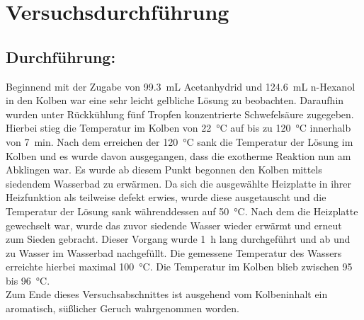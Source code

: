 \section{Versuchsdurchführung}
\label{sec:durchfuerung}


\subsection*{Durchführung:}
Beginnend mit der Zugabe von \SI{99,3}{\milli \liter} Acetanhydrid und \SI{124,6}{\milli \liter} n-Hexanol in den Kolben war eine sehr leicht gelbliche Lösung zu beobachten. Daraufhin wurden unter Rückkühlung fünf Tropfen konzentrierte Schwefelsäure zugegeben. Hierbei stieg die Temperatur im Kolben von \SI{22}{\celsius} auf bis zu \SI{120}{\celsius} innerhalb von \SI{7}{\minute}. Nach dem erreichen der \SI{120}{\celsius} sank die Temperatur der Lösung im Kolben und es wurde davon ausgegangen, dass die exotherme Reaktion nun am Abklingen war. Es wurde ab diesem Punkt begonnen den Kolben mittels siedendem Wasserbad zu erwärmen. Da sich die ausgewählte Heizplatte in ihrer Heizfunktion als teilweise defekt erwies, wurde diese ausgetauscht und die Temperatur der Lösung sank währenddessen auf \SI{50}{\celsius}. Nach dem die Heizplatte gewechselt war, wurde das zuvor siedende Wasser wieder erwärmt und erneut zum Sieden gebracht. Dieser Vorgang wurde \SI{1}{\hour} lang durchgeführt und ab und zu Wasser im Wasserbad nachgefüllt. Die gemessene Temperatur des Wassers erreichte hierbei maximal \SI{100}{\celsius}. Die Temperatur im Kolben blieb zwischen 95 bis \SI{96}{\celsius}.\\ Zum Ende dieses Versuchsabschnittes ist ausgehend vom Kolbeninhalt ein aromatisch, süßlicher Geruch wahrgenommen worden.
\newpage
